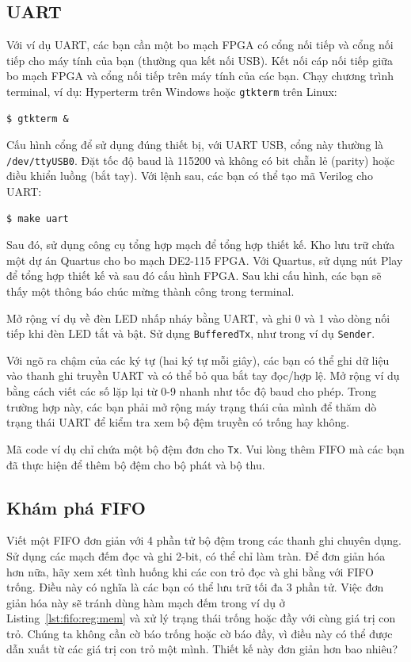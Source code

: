 \documentclass[%
    10pt,
    headinclude, footexclude,
    openright, %
    notitlepage,
    cleardoubleempty,
    headsepline,
    pointlessnumbers,
    bibtotoc, idxtotoc,
    ]{scrbook}
\newcommand{\code}[1]{{\small{\texttt{#1}}}}
\begin{document}
\subsection{UART}

Với ví dụ UART, các bạn cần một bo mạch FPGA có cổng nối tiếp và cổng nối tiếp cho máy tính của bạn (thường qua kết nối USB). Kết nối cáp nối tiếp giữa bo mạch FPGA và cổng nối tiếp trên máy tính của các bạn. Chạy chương trình terminal, ví dụ: Hyperterm trên Windows hoặc \code{gtkterm} trên Linux: 

\begin{verbatim}
$ gtkterm &
\end{verbatim}

Cấu hình cổng để sử dụng đúng thiết bị, với UART USB, cổng này thường là \code{/dev/ttyUSB0}. Đặt tốc độ baud là 115200 và không có bit chẵn lẻ (parity) hoặc điều khiển luồng (bắt tay). Với lệnh sau, các bạn có thể tạo mã Verilog cho UART:

\begin{verbatim}
$ make uart
\end{verbatim}

Sau đó, sử dụng công cụ tổng hợp mạch để tổng hợp thiết kế. Kho lưu trữ chứa một dự án Quartus cho bo mạch DE2-115 FPGA. Với Quartus, sử dụng nút Play để tổng hợp thiết kế và sau đó cấu hình FPGA. Sau khi cấu hình, các bạn sẽ thấy một thông báo chúc mừng thành công trong terminal. 

Mở rộng ví dụ về đèn LED nhấp nháy bằng UART, và ghi 0 và 1 vào dòng nối tiếp khi đèn LED tắt và bật. Sử dụng \code{BufferedTx}, như trong ví dụ \code{Sender}.

Với ngõ ra chậm của các ký tự (hai ký tự mỗi giây), các bạn có thể ghi dữ liệu vào thanh ghi truyền UART và có thể bỏ qua bắt tay đọc/hợp lệ. Mở rộng ví dụ bằng cách viết các số lặp lại từ 0-9 nhanh như tốc độ baud cho phép. Trong trường hợp này, các bạn phải mở rộng máy trạng thái của mình để thăm dò trạng thái UART để kiểm tra xem bộ đệm truyền có trống hay không.

Mã code ví dụ chỉ chứa một bộ đệm đơn cho \code{Tx}. Vui lòng thêm FIFO mà các bạn đã thực hiện để thêm bộ đệm cho bộ phát và bộ thu. 

\subsection{Khám phá FIFO}

Viết một FIFO đơn giản với 4 phần tử bộ đệm trong các thanh ghi chuyên dụng. Sử dụng các mạch đếm đọc và ghi 2-bit, có thể chỉ làm tràn. Để đơn giản hóa hơn nữa, hãy xem xét tình huống khi các con trỏ đọc và ghi bằng với FIFO trống. Điều này có nghĩa là các bạn có thể lưu trữ tối đa 3 phần tử. Việc đơn giản hóa này sẽ tránh dùng hàm mạch đếm trong ví dụ ở Listing~\ref{lst:fifo:reg:mem} và xử lý trạng thái trống hoặc đầy với cùng giá trị con trỏ. Chúng ta không cần cờ báo trống hoặc cờ báo đầy, vì điều này có thể được dẫn xuất từ các giá trị con trỏ một mình. Thiết kế này đơn giản hơn bao nhiêu? 
\end{document}
